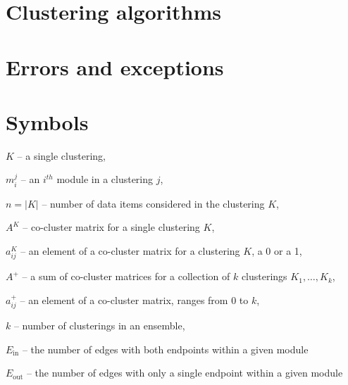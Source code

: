 \section{Clustering algorithms}



\section{Errors and exceptions}


\section{Symbols}

$K$ -- a single clustering,

$m_{i}^{j}$ -- an $i^{th}$ module in a clustering $j$,

$n = |K|$ -- number of data items considered in the clustering $K$,

$A^{K}$ -- co-cluster matrix for a single clustering $K$,

$a_{ij}^{K}$ -- an element of a co-cluster matrix for a clustering $K$, a 0 or a 1,

$A^{+}$ -- a sum of co-cluster matrices for a collection of $k$ clusterings 
  $K_{1}, \ldots, K_{k}$,

$a_{ij}^{+}$ -- an element of a co-cluster matrix, ranges from 0 to $k$,

$k$ -- number of clusterings in an ensemble,

$E_{\textrm{in}}$ -- the number of edges with both endpoints within a given 
  module

$E_{\textrm{out}}$ -- the number of edges with only a single endpoint within a 
  given module


